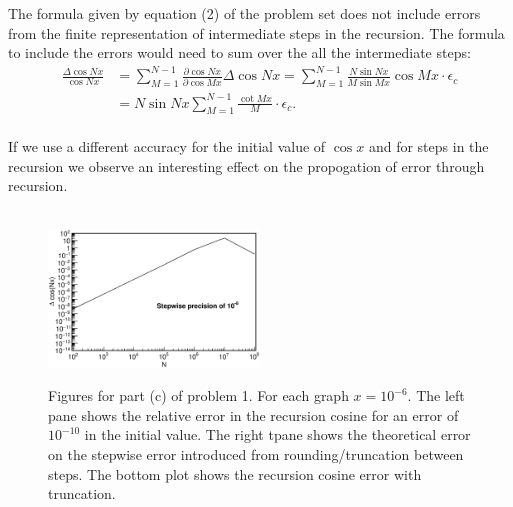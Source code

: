 \documentclass[singlepage,notitlepage,nofootinbib,11pt]{revtex4-1}
\begin{document}
\indent The formula given by equation (2) of the problem set does not include errors from the finite representation of intermediate steps in the recursion. The formula to include the errors would need to sum over the all the intermediate steps:
\begin{align*}
\frac{\Delta\cos Nx}{\cos Nx} &= \sum_{M=1}^{N-1}\frac{\partial \cos Nx}{\partial \cos Mx}\Delta\cos Nx = \sum_{M=1}^{N-1}\frac{N\sin Nx}{M\sin Mx}\cos Mx \cdot \epsilon_c\\
&= N\sin Nx\sum_{M=1}^{N-1}\frac{\cot Mx}{M} \cdot \epsilon_c.
\end{align*}
\\
\indent If we use a different accuracy for the initial value of $\cos x$ and for steps in the recursion we observe an interesting effect on the propogation of error through recursion.
\begin{figure}[h]
  \centering
{}
\\
  \includegraphics[width=0.5\textwidth]{figures/1c_stepwise.eps}
  \hfill
  \caption{Figures for part (c) of problem 1. For each graph $x = 10^{-6}$. The left pane shows the relative error in the recursion cosine for an error of $10^{-10}$ in the initial value. The right tpane shows the theoretical error on the stepwise error introduced from rounding/truncation between steps. The bottom plot shows the recursion cosine error with truncation.}
\end{figure}
\end{document}
